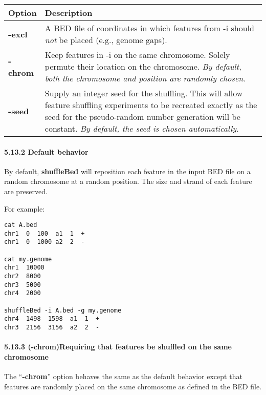 \documentclass[letterpaper,10pt,english]{sphinxmanual}
\begin{document}
\begin{tabulary}{\linewidth}{|L|L|}
\hline
\textbf{
Option
} & \textbf{
Description
}\\\hline

\textbf{-excl}
 & 
A BED file of coordinates in which features from -i should \emph{not} be placed (e.g., genome gaps).
\\\hline

\textbf{-chrom}
 & 
Keep features in -i on the same chromosome. Solely permute their location on the chromosome. \emph{By default, both the chromosome and position are randomly chosen}.
\\\hline

\textbf{-seed}
 & 
Supply an integer seed for the shuffling. This will allow feature shuffling experiments to be recreated exactly as the seed for the pseudo-random number generation will be constant. \emph{By default, the seed is chosen automatically}.
\\\hline
\end{tabulary}



\paragraph{5.13.2 Default behavior}
\label{content/shuffleBed:default-behavior}
By default, \textbf{shuffleBed} will reposition each feature in the input BED file on a random chromosome at a
random position. The size and strand of each feature are preserved.

For example:

\begin{Verbatim}[commandchars=\\\{\}]
cat A.bed
chr1  0  100  a1  1  +
chr1  0  1000 a2  2  -

cat my.genome
chr1  10000
chr2  8000
chr3  5000
chr4  2000

shuffleBed -i A.bed -g my.genome
chr4  1498  1598  a1  1  +
chr3  2156  3156  a2  2  -
\end{Verbatim}


\paragraph{5.13.3 (-chrom)Requiring that features be shuffled on the same chromosome}
\label{content/shuffleBed:chrom-requiring-that-features-be-shuffled-on-the-same-chromosome}
The ``\textbf{-chrom}'' option behaves the same as the default behavior except that features are randomly
placed on the same chromosome as defined in the BED file.
\end{document}
